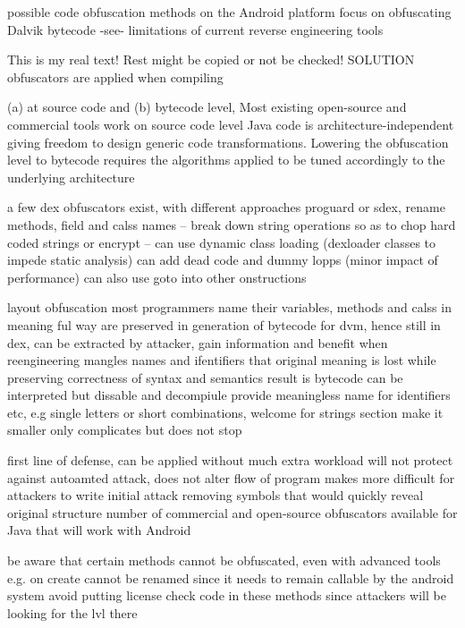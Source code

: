 possible code obfuscation methods on the Android platform focus on obfuscating Dalvik bytecode -see- limitations of current reverse engineering tools\newline

This is my real text! Rest might be copied or not be checked!
SOLUTION
obfuscators are applied when compiling

%
(a) at source code and (b) bytecode level, Most existing open-source and commercial tools work on source code level\newline
Java code is architecture-independent giving freedom to design generic code transformations. Lowering the obfuscation level to bytecode requires the algorithms applied to be tuned accordingly to the underlying architecture\newline
\cite{kovachevaMaster}
%

%
a few dex obfuscators exist, with different approaches
proguard or sdex, rename methods, field and calss names -- break down string operations so as to chop hard coded strings or encrypt -- can use dynamic class loading (dexloader classes to impede static analysis)
can add dead code and dummy lopps (minor impact of performance)
can also use goto into other onstructions

\cite{andevconDalvikART}
%


%

layout obfuscation
most programmers name their variables, methods and calss in meaning ful way
are preserved in generation of bytecode for dvm, hence still in dex, can be extracted by attacker, gain information and benefit when reengineering
mangles names and ifentifiers that original meaning is lost while preserving correctness of syntax and semantics
result is bytecode can be interpreted but dissable and decompiule provide meaningless name for identifiers etc, e.g single letters or short combinations, welcome for strings section make it smaller
only complicates but does not stop


\cite{munteanLicense}
%

%
first line of defense, can be applied without much extra workload
will not protect against autoamted attack, does not alter flow of program
makes more difficult for attackers to write initial attack
removing symbols that would quickly reveal original structure
number of commercial and open-source obfuscators available for Java that will work with Android

be aware that certain methods cannot be obfuscated, even with advanced tools
e.g. on create cannot be renamed since it needs to remain callable by the android system
avoid putting license check code in these methods since attackers will be looking for the lvl there
\cite{developersSecuring}
%


